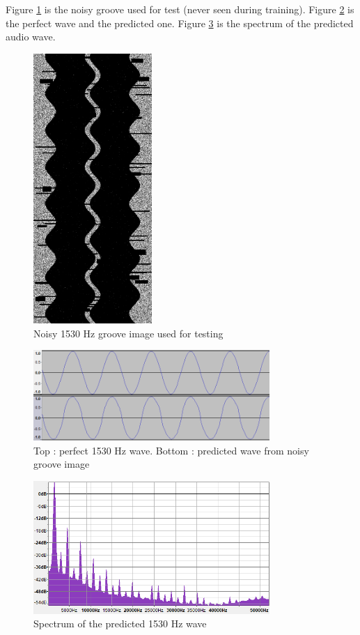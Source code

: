 \documentclass[12pt, twoside]{article}
\begin{document}
Figure \ref{groove1530} is the noisy groove used for test (never seen during training). Figure \ref{predm4000} is the perfect wave and the predicted one. Figure \ref{spectrum4000} is the spectrum of the predicted audio wave.
\begin{figure}
	\centering
	\includegraphics[width=0.4\textwidth]{../images/groove1530.png}
	\caption{Noisy 1530 Hz groove image used for testing}
	\label{groove1530}
\end{figure}
\begin{figure}
	\centering
	\includegraphics[width=0.8\textwidth]{../images/predm4000.png}
	\caption{Top : perfect 1530 Hz wave. Bottom : predicted wave from noisy groove image}
	\label{predm4000}
\end{figure}
\begin{figure}
	\centering
	\includegraphics[width=0.8\textwidth]{../images/spectrum_m4000.png}
	\caption{Spectrum of the predicted 1530 Hz wave}
	\label{spectrum4000}
\end{figure}
\end{document}
